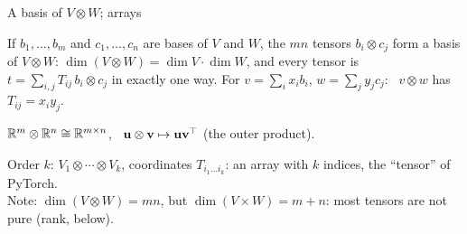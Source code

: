 \documentclass[aspectratio=1610,11pt]{beamer}
\begin{document}
\begin{frame}{A basis of $V \otimes W$; arrays}
    \begin{theorem}
        \small If $b_1, \ldots, b_m$ and $c_1, \ldots, c_n$ are bases of $V$ and $W$, the $mn$ tensors $b_i \otimes c_j$ form a basis of $V \otimes W$: $\dim(V \otimes W) = \dim V \cdot \dim W$, and every tensor is $t = \sum_{i,j}T_{ij}\,b_i \otimes c_j$ in exactly one way. For $v = \sum_ix_ib_i$, $w = \sum_jy_jc_j$: \ $v \otimes w$ has $T_{ij} = x_iy_j$.
    \end{theorem}
    \begin{corollary}
        \small $\mathbb{R}^m \otimes \mathbb{R}^n \cong \mathbb{R}^{m \times n}$, \ $\mathbf{u} \otimes \mathbf{v} \mapsto \mathbf{u}\mathbf{v}^\top$ (the outer product).
    \end{corollary}
    \small
    Order $k$: $V_1 \otimes \cdots \otimes V_k$, coordinates $T_{i_1\ldots i_k}$: an array with $k$ indices, the ``tensor'' of PyTorch. \\
    Note: $\dim(V \otimes W) = mn$, but $\dim(V \times W) = m + n$: most tensors are not pure (rank, below).
\end{frame}

\end{document}
